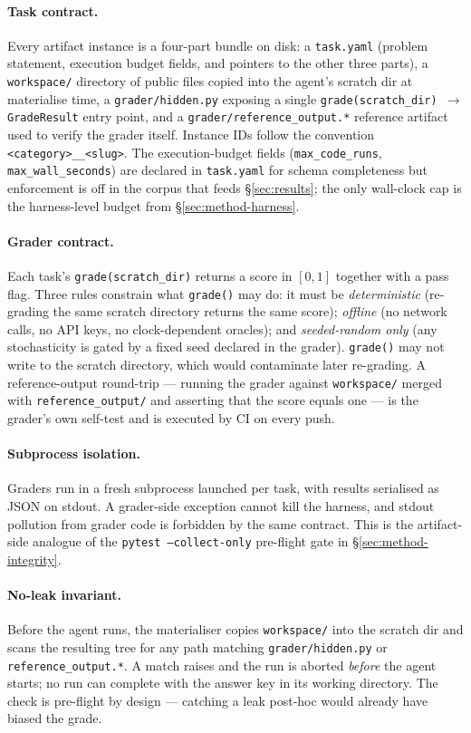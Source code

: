 \paragraph{Task contract.} Every artifact instance is a four-part
bundle on disk: a \texttt{task.yaml} (problem statement, execution
budget fields, and pointers to the other three parts), a
\texttt{workspace/} directory of public files copied into the agent's
scratch dir at materialise time, a \texttt{grader/hidden.py} exposing
a single \texttt{grade(scratch\_dir) $\rightarrow$ GradeResult} entry
point, and a \texttt{grader/reference\_output.*} reference artifact
used to verify the grader itself. Instance IDs follow the convention
\texttt{<category>\_\_<slug>}. The execution-budget fields
(\texttt{max\_code\_runs}, \texttt{max\_wall\_seconds}) are declared
in \texttt{task.yaml} for schema completeness but enforcement is off
in the corpus that feeds §\ref{sec:results}; the only wall-clock cap
is the harness-level budget from §\ref{sec:method-harness}.

\paragraph{Grader contract.} Each task's \texttt{grade(scratch\_dir)}
returns a score in $[0, 1]$ together with a pass flag. Three rules
constrain what \texttt{grade()} may do: it must be
\emph{deterministic} (re-grading the same scratch directory returns
the same score); \emph{offline} (no network calls, no API keys, no
clock-dependent oracles); and \emph{seeded-random only} (any
stochasticity is gated by a fixed seed declared in the grader).
\texttt{grade()} may not write to the scratch directory, which would
contaminate later re-grading. A reference-output round-trip ---
running the grader against \texttt{workspace/} merged with
\texttt{reference\_output/} and asserting that the score equals one
--- is the grader's own self-test and is executed by CI on every
push.

\paragraph{Subprocess isolation.} Graders run in a fresh subprocess
launched per task, with results serialised as JSON on stdout. A
grader-side exception cannot kill the harness, and stdout pollution
from grader code is forbidden by the same contract. This is the
artifact-side analogue of the
\texttt{pytest~--collect-only} pre-flight gate in
§\ref{sec:method-integrity}.

\paragraph{No-leak invariant.} Before the agent runs, the
materialiser copies \texttt{workspace/} into the scratch dir and
scans the resulting tree for any path matching
\texttt{grader/hidden.py} or \texttt{reference\_output.*}. A match
raises and the run is aborted \emph{before} the agent starts; no run
can complete with the answer key in its working directory. The check
is pre-flight by design --- catching a leak post-hoc would already
have biased the grade.
